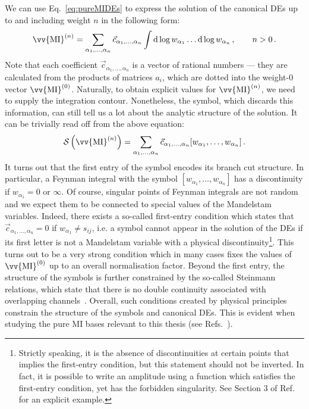 \documentclass[main.tex]{subfiles}
\begin{document}
We can use Eq.~\ref{eq:pureMIDEs} to express the solution of the canonical DEs up to and including weight $n$ in the following form:
\begin{equation} \label{eq:pureMIDEsupton}
    \vv{\text{MI}}^{(n)} = \sum_{\alpha_1, \ldots, \alpha_n} \vec{c}_{\alpha_1, \ldots, \alpha_n} \int \dd \log w_{\alpha_1} \ldots \dd \log w_{\alpha_n}\,, \qquad n>0 \,.
\end{equation}
Note that each coefficient $\vec{c}_{\alpha_1, \ldots, \alpha_n}$ is a vector of rational numbers --- they are calculated from the products of matrices $a_i$, which are dotted into the weight-0 vector $\vv{\text{MI}}^{(0)}$. Naturally, to obtain explicit values for $\vv{\text{MI}}^{(n)}$, we need to supply the integration contour. Nonetheless, the symbol, which discards this information, can still tell us a lot about the analytic structure of the solution. It can be trivially read off from the above equation:
\begin{equation}
    \SS\left(\vv{\text{MI}}^{(n)}\right) = \sum_{\alpha_1, \ldots, \alpha_n} \vec{c}_{\alpha_1, \ldots, \alpha_n} [w_{\alpha_1}, \ldots, w_{\alpha_n}]\,.
\end{equation}
It turns out that the first entry of the symbol encodes its branch cut structure. In particular, a Feynman integral with the symbol $[w_{\alpha_1}, \ldots, w_{\alpha_n}]$ has a discontinuity if $w_{\alpha_1}=0$ or $\infty$. Of course, singular points of Feynman integrals are not random and we expect them to be connected to special values of the Mandelstam variables. Indeed, there exists a so-called first-entry condition which states that $\vec{c}_{\alpha_1, \ldots, \alpha_n}=0$ if $w_{\alpha_1} \neq s_{ij}$, i.e. a symbol cannot appear in the solution of the DEs if its first letter is not a Mandelstam variable with a physical discontinuity\footnote{Strictly speaking, it is the absence of discontinuities at certain points that implies the first-entry condition, but this statement should not be inverted. In fact, it is possible to write an amplitude using a function which satisfies the first-entry condition, yet has the forbidden singularity. See Section 3 of Ref.~\cite{Zoia:2021zmb} for an explicit example.}\cite{Gaiotto:2011dt}. This turns out to be a very strong condition which in many cases fixes the values of $\vv{\text{MI}}^{(0)}$ up to an overall normalisation factor. Beyond the first entry, the structure of the symbols is further constrained by the so-called Steinmann relations, which state that there is no double continuity associated with overlapping channels~\cite{20.500.11850/135473, Steinmann:1960, Caron-Huot:2016owq, Dixon:2016nkn}. Overall, such conditions created by physical principles constrain the structure of the symbols and canonical DEs. This is evident when studying the pure MI bases relevant to this thesis (see Refs.~\cite{Abreu:2020jxa, abreu2021twoloop}).
\renewcommand{\theequation}{C.\arabic{section}.\arabic{equation}}
\end{document}
